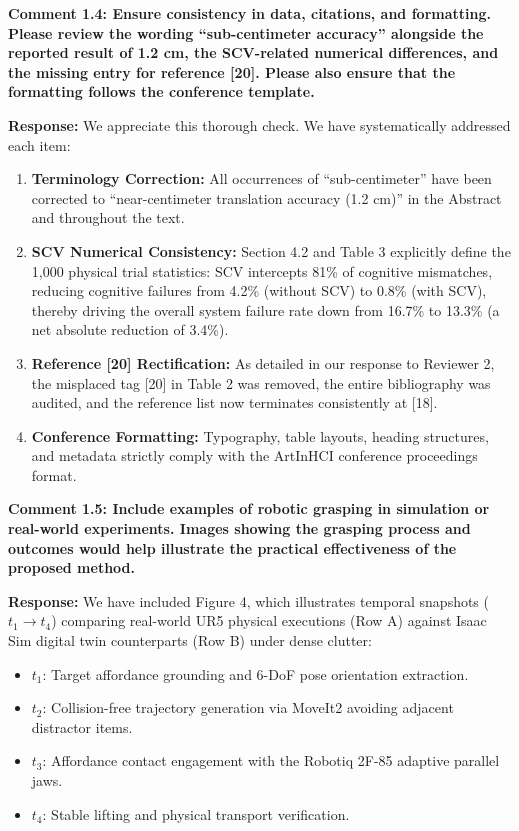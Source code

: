 \documentclass[11pt]{article}
\newcommand{\reviewercomment}[1]{\vspace{1.8ex}\noindent\textbf{\textcolor{revcolor}{#1}}}
\newcommand{\response}{\vspace{1ex}\noindent\textbf{Response: }}
\begin{document}
\reviewercomment{Comment 1.4: Ensure consistency in data, citations, and formatting. Please review the wording ``sub-centimeter accuracy'' alongside the reported result of 1.2 cm, the SCV-related numerical differences, and the missing entry for reference [20]. Please also ensure that the formatting follows the conference template.}

\response
We appreciate this thorough check. We have systematically addressed each item:
\begin{enumerate}[leftmargin=*]
    \item \textbf{Terminology Correction:} All occurrences of ``sub-centimeter'' have been corrected to ``near-centimeter translation accuracy (1.2 cm)'' in the Abstract and throughout the text.
    \item \textbf{SCV Numerical Consistency:} Section 4.2 and Table 3 explicitly define the 1,000 physical trial statistics: SCV intercepts 81\% of cognitive mismatches, reducing cognitive failures from 4.2\% (without SCV) to 0.8\% (with SCV), thereby driving the overall system failure rate down from 16.7\% to 13.3\% (a net absolute reduction of 3.4\%).
    \item \textbf{Reference [20] Rectification:} As detailed in our response to Reviewer 2, the misplaced tag [20] in Table 2 was removed, the entire bibliography was audited, and the reference list now terminates consistently at [18].
    \item \textbf{Conference Formatting:} Typography, table layouts, heading structures, and metadata strictly comply with the ArtInHCI conference proceedings format.
\end{enumerate}

\reviewercomment{Comment 1.5: Include examples of robotic grasping in simulation or real-world experiments. Images showing the grasping process and outcomes would help illustrate the practical effectiveness of the proposed method.}

\response
We have included Figure 4, which illustrates temporal snapshots ($t_1 \to t_4$) comparing real-world UR5 physical executions (Row A) against Isaac Sim digital twin counterparts (Row B) under dense clutter:
\begin{itemize}[leftmargin=*]
    \item $t_1$: Target affordance grounding and 6-DoF pose orientation extraction.
    \item $t_2$: Collision-free trajectory generation via MoveIt2 avoiding adjacent distractor items.
    \item $t_3$: Affordance contact engagement with the Robotiq 2F-85 adaptive parallel jaws.
    \item $t_4$: Stable lifting and physical transport verification.
\end{itemize}
\end{document}
